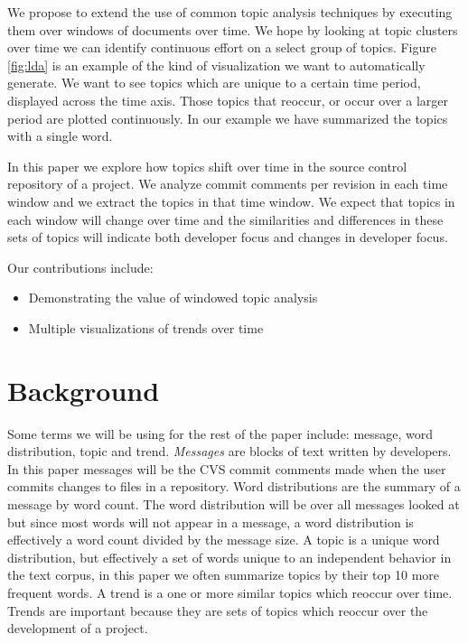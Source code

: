 \documentclass[times, 10pt,twocolumn]{article}
\begin{document}
We propose to extend the use of common topic analysis techniques by
executing them over windows of documents over time. We hope by looking
at topic clusters over time we can identify continuous effort on a
select group of topics. Figure \ref{fig:lda} is an example of the kind
of visualization we want to automatically generate. We want to see
topics which are unique to a certain time period, displayed across the
time axis. Those topics that reoccur, or occur over a larger period
are plotted continuously. In our example we have summarized the topics
with a single word.


In this paper we explore how topics shift over time in the
source control repository of a project. We analyze commit comments per
revision in each time window and we extract the topics in that time
window. We expect that topics in each window will change over time and
the similarities and differences in these sets of topics will indicate
both developer focus and changes in developer focus.

Our contributions include:
\begin{itemize}
\item Demonstrating the value of windowed topic analysis
\item Multiple visualizations of trends over time
\end{itemize}


\section{Background}


Some terms we will be using for the rest of the paper include:
message, word distribution, topic and trend. \emph{Messages} are
blocks of text written by developers. In this paper messages will be
the CVS commit comments made when the user commits changes to files in
a repository. Word distributions are the summary of a message by word
count. The word distribution will be over all messages
looked at but since most words will not appear in a message, a word
distribution is effectively a word count divided by the message
size. A topic is a unique word distribution, but effectively a set of
words unique to an independent behavior in the text corpus, in this
paper we often summarize topics by their top 10 more frequent words.
A trend is a one or more similar topics which reoccur over
time. Trends are important because they are sets of topics which
reoccur over the development of a project.


\end{document}
